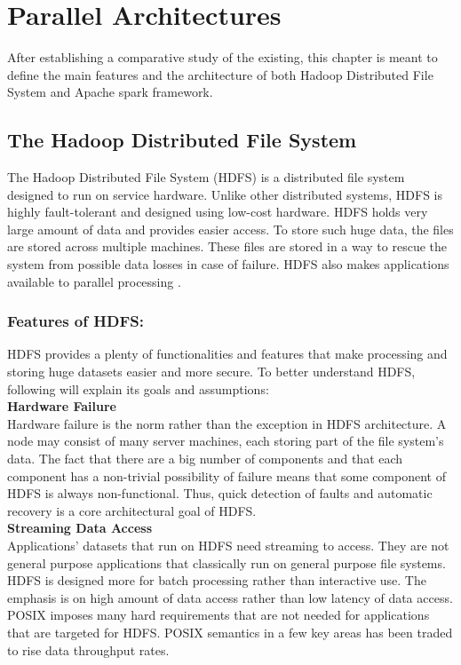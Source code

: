 \chapter{Parallel Architectures}
\label{Chapter2prime}
After establishing a comparative study of the existing, this chapter is meant to define the main features and the architecture of both Hadoop Distributed File System and Apache spark framework.  

\section{The Hadoop Distributed File System}

The Hadoop Distributed File System (HDFS) is a distributed file system designed to run on service hardware. Unlike other distributed systems, HDFS is highly fault-tolerant and designed using low-cost hardware. HDFS holds very large amount of data and provides easier access. To store such huge data, the files are stored across multiple machines. These files are stored in a way to rescue the system from possible data losses in case of failure. HDFS also makes applications available to parallel processing \cite{cite14}.\\

\subsection{Features of HDFS:}
HDFS provides a plenty of functionalities and features that make processing and storing huge datasets easier and more secure. To better understand HDFS, following will explain its goals and assumptions: \\

\textbf{\normalsize{Hardware Failure}}\\

Hardware failure is the norm rather than the exception in HDFS architecture. A node may consist of many server machines, each storing part of the file system's data. The fact that there are a big number of components and that each component has a non-trivial possibility of failure means that some component of HDFS is always non-functional. Thus, quick detection of faults and automatic recovery is a core architectural goal of HDFS.\\

\textbf{\normalsize{Streaming Data Access}}\\

Applications' datasets that run on HDFS need streaming to access. They are not general purpose applications that classically run on general purpose file systems. HDFS is designed more for batch processing rather than interactive use. The emphasis is on high amount of data access rather than low latency of data access. POSIX imposes many hard requirements that are not needed for applications that are targeted for HDFS. POSIX semantics in a few key areas has been traded to rise data throughput rates.\\

